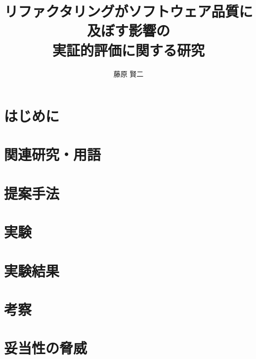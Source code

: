 \documentclass[12pt,uplatex]{jsarticle}   %
\title{リファクタリングがソフトウェア品質に及ぼす影響の\\実証的評価に関する研究}
\author{藤原 賢二}
\begin{document}
%
%
\titlepage
\jabstractpage
%
%
\tableofcontents
\newpage


\section{はじめに}


\section{関連研究・用語}


\section{提案手法}


\section{実験}


\section{実験結果}


\section{考察}


\section{妥当性の脅威}

\end{document}
